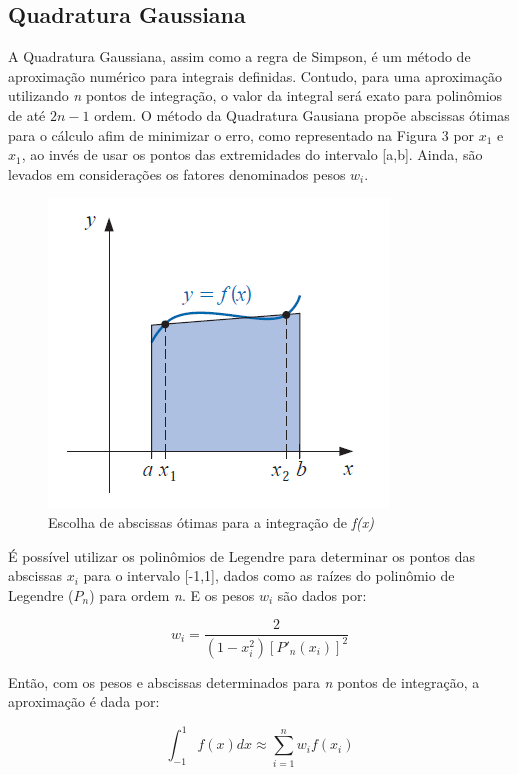 \documentclass[12pt,a4paper]{article}
\begin{document}
\newpage
\subsection{Quadratura Gaussiana}

\qquad A Quadratura Gaussiana, assim como a regra de Simpson, é um método de aproximação numérico para integrais definidas. Contudo, para uma aproximação utilizando \textit{n} pontos de integração, o valor da integral será exato para polinômios de até $2\textit{n}-1$ ordem. O método da Quadratura Gausiana propõe abscissas ótimas para o cálculo afim de minimizar o erro, como representado na Figura 3 por $x_{1}$ e $x_{1}$, ao invés de usar os pontos das extremidades do intervalo [a,b]. Ainda, são levados em considerações os fatores denominados pesos $w_{i}$. 

\begin{figure}[h]
\includegraphics{gaussapproximation}
\caption{Escolha de abscissas ótimas para a integração de \textit{f(x)}}
\end{figure}

\qquad É possível utilizar os polinômios de Legendre para determinar os pontos das abscissas $x_{i}$ para o intervalo [-1,1], dados como as raízes do polinômio de Legendre (\textit{$P_{n}$}) para ordem \textit{n}. E os pesos $w_{i}$ são dados por:

\begin{equation}
w_{i}=\dfrac{2}{(1-x^2_{i})[P'_{n}(x_{i})]^2}
\end{equation}

\qquad Então, com os pesos e abscissas determinados para \textit{n} pontos de integração, a aproximação é dada por:

\begin{equation}
\int_{-1}^{1} f(x)dx \approx \sum_{i=1}^{n} w_{i}f(x_{i})
\end{equation}
\end{document}
